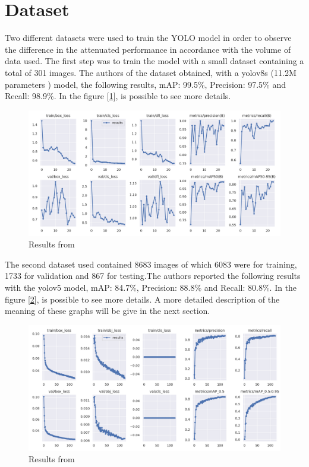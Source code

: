 \documentclass[12pt]{article}
\begin{document}

\section{Dataset}
Two different datasets were used to train the YOLO model in order to observe the difference in the attenuated performance in accordance with the volume of data used. The first step was to train the model with a small dataset \cite{carplate-xuk6s_dataset} containing a total of 301 images. The authors of the dataset obtained, with a yolov8s (11.2M parameters \cite{yolo1}) model, the following results, mAP: 99.5\%, Precision: 97.5\% and Recall: 98.9\%. In the figure [\ref{fig:mesh1}], is possible to see more details.

\begin{figure}[H]
    \centering
    \includegraphics[width=0.8\linewidth]{results_small dataset.png}
    \caption{Results from \cite{carplate-xuk6s_dataset}}
    \label{fig:mesh1}
\end{figure}

The second dataset \cite{tablice-73he1_dataset} used contained 8683 images of which 6083 were for training, 1733 for validation and 867 for testing.The authors reported the following results with the yolov5 model, mAP: 84.7\%, Precision: 88.8\% and Recall: 80.8\%. In the figure [\ref{fig:mesh2}], is possible to see more details. A more detailed description of the meaning of these graphs will be give in the next section.

\begin{figure}[H]
    \centering
    \includegraphics[width=0.8\linewidth]{results_big_dataset.png}
    \caption{Results from \cite{tablice-73he1_dataset}}
    \label{fig:mesh2}
\end{figure}
\end{document}
